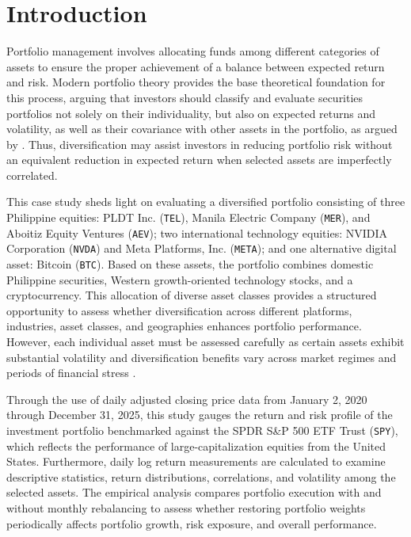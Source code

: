 \section{Introduction}

Portfolio management involves allocating funds among different categories of assets to ensure the proper achievement of a balance between expected return and risk. Modern portfolio theory provides the base theoretical foundation for this process, arguing that investors should classify and evaluate securities portfolios not solely on their individuality, but also on expected returns and volatility, as well as their covariance with other assets in the portfolio, as argued by \textcite{markowitz1952}. Thus, diversification may assist investors in reducing portfolio risk without an equivalent reduction in expected return when selected assets are imperfectly correlated.

This case study sheds light on evaluating a diversified portfolio consisting of three Philippine equities: PLDT Inc. (\texttt{TEL}), Manila Electric Company (\texttt{MER}), and Aboitiz Equity Ventures (\texttt{AEV}); two international technology equities: NVIDIA Corporation (\texttt{NVDA}) and Meta Platforms, Inc. (\texttt{META}); and one alternative digital asset: Bitcoin (\texttt{BTC}). Based on these assets, the portfolio combines domestic Philippine securities, Western growth-oriented technology stocks, and a cryptocurrency. This allocation of diverse asset classes provides a structured opportunity to assess whether diversification across different platforms, industries, asset classes, and geographies enhances portfolio performance. However, each individual asset must be assessed carefully as certain assets exhibit substantial volatility and diversification benefits vary across market regimes and periods of financial stress \parencite{almeida2023}.

Through the use of daily adjusted closing price data from January 2, 2020 through December 31, 2025, this study gauges the return and risk profile of the investment portfolio benchmarked against the SPDR S\&P 500 ETF Trust (\texttt{SPY}), which reflects the performance of large-capitalization equities from the United States. Furthermore, daily log return measurements are calculated to examine descriptive statistics, return distributions, correlations, and volatility among the selected assets. The empirical analysis compares portfolio execution with and without monthly rebalancing to assess whether restoring portfolio weights periodically affects portfolio growth, risk exposure, and overall performance.

